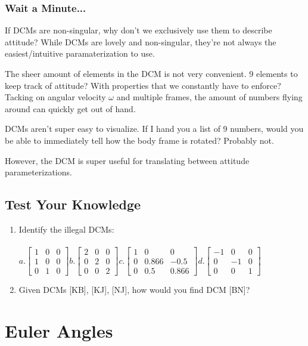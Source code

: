 \documentclass[a4paper,14pt]{extreport}
\begin{document}
\subsection{Wait a Minute...}
If DCMs are non-singular, why don't we exclusively use them to describe attitude? While DCMs are lovely and non-singular, they're not always the easiest/intuitive paramaterization to use. 


The sheer amount of elements in the DCM is not very convenient. 9 elements to keep track of attitude? With properties that we constantly have to enforce? Tacking on angular velocity $\omega$ and multiple frames, the amount of numbers flying around can quickly get out of hand.

DCMs aren't super easy to visualize. If I hand you a list of 9 numbers, would you be able to immediately tell how the body frame is rotated? Probably not.

However, the DCM is super useful for translating between attitude parameterizations.

\section{Test Your Knowledge}
\begin{enumerate}
\item Identify the illegal DCMs:\\\\
	$
	a.
	\begin{bmatrix}
			1&0&0\\
			1&0&0\\
			0&1&0
	\end{bmatrix} 
	b.	
	\begin{bmatrix}
			2&0&0\\
			0&2&0\\
			0&0&2
	\end{bmatrix}
	c.	
	\begin{bmatrix}
			1&0&0\\
			0&0.866&-0.5\\
			0&0.5&0.866
	\end{bmatrix}
	d.
	\begin{bmatrix}
			-1&0&0\\
			0&-1&0\\
			0&0&1
	\end{bmatrix}$ 
\item{Given DCMs [KB], [KJ], [NJ], how would you find DCM [BN]?}
\end{enumerate}

\chapter{Euler Angles}
\end{document}
